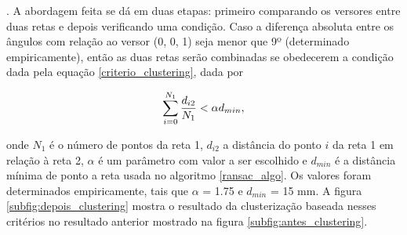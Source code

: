 \documentclass[a4paper,12pt,oneside]{book}
\begin{document}
\par. A abordagem feita se dá em duas etapas: primeiro comparando os versores entre duas retas e depois verificando uma condição. Caso a diferença absoluta entre os ângulos com relação ao versor (0, 0, 1) seja menor que 9º (determinado empiricamente), então as duas retas serão combinadas se obedecerem a condição dada pela equação \ref{criterio_clustering}, dada por

\begin{equation}\label{criterio_clustering}
    \sum_{i = 0}^{N_1}\frac{d_{i2}}{N_1} < \alpha \space d_{min}, 
\end{equation}

onde $N_1$ é o número de pontos da reta 1, $d_{i2}$ a distância do ponto $i$ da reta 1 em relação à reta 2, $\alpha$ é um parâmetro com valor a ser escolhido e $d_{min}$ é a distância mínima de ponto a reta usada no algoritmo \ref{ransac_algo}. Os valores foram determinados empiricamente, tais que $\alpha$ = 1.75 e $d_{min}$ = 15 mm. A figura \ref{subfig:depois_clustering} mostra o resultado da clusterização baseada nesses critérios no resultado anterior mostrado na figura \ref{subfig:antes_clustering}.






\end{document}
